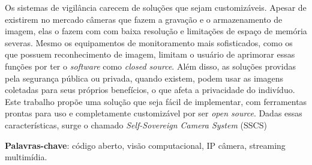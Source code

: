 \documentclass[12pt, %
openright, 
oneside, %
a4paper,    %
brazil]{facom-ufu-abntex2}
\begin{document}



\begin{resumo} %
	Os sistemas de vigilância carecem de soluções
	que sejam customizáveis. Apesar de existirem no mercado câmeras que fazem a gravação e o armazenamento de
	imagem, elas o fazem com com baixa resolução e limitações de espaço de memória severas. Mesmo os equipamentos
	de monitoramento mais sofisticados, como os que possuem reconhecimento de imagem, limitam o usuário de aprimorar
	essas funções por ter o \textit{\foreignlanguage{english}{software}} como \textit{\foreignlanguage{english}{closed source}}.
	Além disso, as soluções providas pela segurança pública ou privada, quando existem, podem usar as imagens
	coletadas para seus próprios benefícios, o que afeta a privacidade do indivíduo. Este trabalho propõe uma solução que seja
	fácil de implementar, com ferramentas prontas para uso e completamente customizável por ser \textit{\foreignlanguage{english}{open source}}.
	Dadas essas características, surge o chamado \textit{\foreignlanguage{english}{Self-Sovereign Camera System}} (SSCS)
	\vspace{\onelineskip}

	\noindent
	\textbf{Palavras-chave}: código  aberto, visão computacional, IP câmera, streaming multimídia.  %
\end{resumo}
\end{document}

